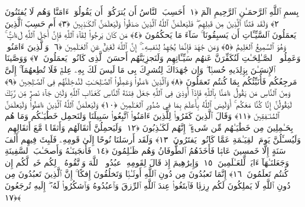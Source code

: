 
  
    
  
    
    

\nopagebreak
  بِسمِ ٱللَّهِ ٱلرَّحمَـٰنِ ٱلرَّحِيمِ
  الٓمٓ ﴿١﴾
 أَحَسِبَ ٱلنَّاسُ أَن يُترَكُوٓا۟ أَن يَقُولُوٓا۟ ءَامَنَّا وَهُم لَا يُفتَنُونَ ﴿٢﴾
 وَلَقَد فَتَنَّا ٱلَّذِينَ مِن قَبلِهِم ۖ فَلَيَعلَمَنَّ ٱللَّهُ ٱلَّذِينَ صَدَقُوا۟ وَلَيَعلَمَنَّ ٱلكَـٰذِبِينَ ﴿٣﴾
 أَم حَسِبَ ٱلَّذِينَ يَعمَلُونَ ٱلسَّيِّـَٔاتِ أَن يَسبِقُونَا ۚ سَآءَ مَا يَحكُمُونَ ﴿٤﴾
 مَن كَانَ يَرجُوا۟ لِقَآءَ ٱللَّهِ فَإِنَّ أَجَلَ ٱللَّهِ لَءَاتٍۢ ۚ وَهُوَ ٱلسَّمِيعُ ٱلعَلِيمُ ﴿٥﴾
 وَمَن جَٰهَدَ فَإِنَّمَا يُجَٰهِدُ لِنَفسِهِۦٓ ۚ إِنَّ ٱللَّهَ لَغَنِىٌّ عَنِ ٱلعَـٰلَمِينَ ﴿٦﴾
 وَٱلَّذِينَ ءَامَنُوا۟ وَعَمِلُوا۟ ٱلصَّـٰلِحَـٰتِ لَنُكَفِّرَنَّ عَنهُم سَيِّـَٔاتِهِم وَلَنَجزِيَنَّهُم أَحسَنَ ٱلَّذِى كَانُوا۟ يَعمَلُونَ ﴿٧﴾
 وَوَصَّينَا ٱلإِنسَـٰنَ بِوَٟلِدَيهِ حُسنًۭا ۖ وَإِن جَٰهَدَاكَ لِتُشرِكَ بِى مَا لَيسَ لَكَ بِهِۦ عِلمٌۭ فَلَا تُطِعهُمَآ ۚ إِلَىَّ مَرجِعُكُم فَأُنَبِّئُكُم بِمَا كُنتُم تَعمَلُونَ ﴿٨﴾
 وَٱلَّذِينَ ءَامَنُوا۟ وَعَمِلُوا۟ ٱلصَّـٰلِحَـٰتِ لَنُدخِلَنَّهُم فِى ٱلصَّـٰلِحِينَ ﴿٩﴾
 وَمِنَ ٱلنَّاسِ مَن يَقُولُ ءَامَنَّا بِٱللَّهِ فَإِذَآ أُوذِىَ فِى ٱللَّهِ جَعَلَ فِتنَةَ ٱلنَّاسِ كَعَذَابِ ٱللَّهِ وَلَئِن جَآءَ نَصرٌۭ مِّن رَّبِّكَ لَيَقُولُنَّ إِنَّا كُنَّا مَعَكُم ۚ أَوَلَيسَ ٱللَّهُ بِأَعلَمَ بِمَا فِى صُدُورِ ٱلعَـٰلَمِينَ ﴿١٠﴾
 وَلَيَعلَمَنَّ ٱللَّهُ ٱلَّذِينَ ءَامَنُوا۟ وَلَيَعلَمَنَّ ٱلمُنَـٰفِقِينَ ﴿١١﴾
 وَقَالَ ٱلَّذِينَ كَفَرُوا۟ لِلَّذِينَ ءَامَنُوا۟ ٱتَّبِعُوا۟ سَبِيلَنَا وَلنَحمِل خَطَٰيَـٰكُم وَمَا هُم بِحَـٰمِلِينَ مِن خَطَٰيَـٰهُم مِّن شَىءٍ ۖ إِنَّهُم لَكَـٰذِبُونَ ﴿١٢﴾
 وَلَيَحمِلُنَّ أَثقَالَهُم وَأَثقَالًۭا مَّعَ أَثقَالِهِم ۖ وَلَيُسـَٔلُنَّ يَومَ ٱلقِيَـٰمَةِ عَمَّا كَانُوا۟ يَفتَرُونَ ﴿١٣﴾
 وَلَقَد أَرسَلنَا نُوحًا إِلَىٰ قَومِهِۦ فَلَبِثَ فِيهِم أَلفَ سَنَةٍ إِلَّا خَمسِينَ عَامًۭا فَأَخَذَهُمُ ٱلطُّوفَانُ وَهُم ظَـٰلِمُونَ ﴿١٤﴾
 فَأَنجَينَـٰهُ وَأَصحَـٰبَ ٱلسَّفِينَةِ وَجَعَلنَـٰهَآ ءَايَةًۭ لِّلعَـٰلَمِينَ ﴿١٥﴾
 وَإِبرَٰهِيمَ إِذ قَالَ لِقَومِهِ ٱعبُدُوا۟ ٱللَّهَ وَٱتَّقُوهُ ۖ ذَٟلِكُم خَيرٌۭ لَّكُم إِن كُنتُم تَعلَمُونَ ﴿١٦﴾
 إِنَّمَا تَعبُدُونَ مِن دُونِ ٱللَّهِ أَوثَـٰنًۭا وَتَخلُقُونَ إِفكًا ۚ إِنَّ ٱلَّذِينَ تَعبُدُونَ مِن دُونِ ٱللَّهِ لَا يَملِكُونَ لَكُم رِزقًۭا فَٱبتَغُوا۟ عِندَ ٱللَّهِ ٱلرِّزقَ وَٱعبُدُوهُ وَٱشكُرُوا۟ لَهُۥٓ ۖ إِلَيهِ تُرجَعُونَ ﴿١٧﴾

